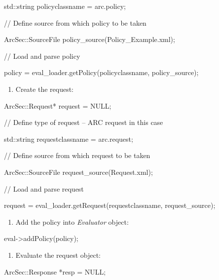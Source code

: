 \documentclass{article}
\newcommand\liststyleWWviiiNumv{%
\renewcommand\theenumi{\alph{enumi}}
\renewcommand\theenumii{\arabic{enumii}}
\renewcommand\theenumiii{\arabic{enumiii}}
\renewcommand\theenumiv{\arabic{enumiv}}
\renewcommand\labelenumi{\theenumi)}
\renewcommand\labelenumii{\theenumii.}
\renewcommand\labelenumiii{\theenumiii.}
\renewcommand\labelenumiv{\theenumiv.}
}
\newcommand\liststyleWWviiiNumvi{%
\renewcommand\theenumi{\alph{enumi}}
\renewcommand\theenumii{\arabic{enumii}}
\renewcommand\theenumiii{\arabic{enumiii}}
\renewcommand\theenumiv{\arabic{enumiv}}
\renewcommand\labelenumi{\theenumi)}
\renewcommand\labelenumii{\theenumii.}
\renewcommand\labelenumiii{\theenumiii.}
\renewcommand\labelenumiv{\theenumiv.}
}
\newcommand\liststyleWWviiiNumvii{%
\renewcommand\theenumi{\alph{enumi}}
\renewcommand\theenumii{\arabic{enumii}}
\renewcommand\theenumiii{\arabic{enumiii}}
\renewcommand\theenumiv{\arabic{enumiv}}
\renewcommand\labelenumi{\theenumi)}
\renewcommand\labelenumii{\theenumii.}
\renewcommand\labelenumiii{\theenumiii.}
\renewcommand\labelenumiv{\theenumiv.}
}
\begin{document}
{\ttfamily\color{black}
std::string policyclassname = {\textquotedbl}arc.policy{\textquotedbl};
}

{\ttfamily\color{black}
// Define source from which policy to be taken}

{\ttfamily\color{black}
ArcSec::SourceFile
policy\_source({\textquotedbl}Policy\_Example.xml{\textquotedbl}); }

{\ttfamily\color{black}
// Load and parse policy}

{\ttfamily\color{black}
policy = eval\_loader.getPolicy(policyclassname, policy\_source); }

\liststyleWWviiiNumv
\begin{enumerate}
\item {\color{black}
Create the request:}
\end{enumerate}
{\ttfamily\color{black}
ArcSec::Request* request = NULL;}

{\ttfamily\color{black}
// Define type of request -- ARC request in this case}

{\ttfamily\color{black}
std::string requestclassname =
{\textquotedbl}arc.request{\textquotedbl};}

{\ttfamily\color{black}
// Define source from which request to be taken}

{\ttfamily\color{black}
ArcSec::SourceFile
request\_source({\textquotedbl}Request.xml{\textquotedbl});}

{\ttfamily\color{black}
// Load and parse request}

{\ttfamily\color{black}
request = eval\_loader.getRequest(requestclassname, request\_source);}

\liststyleWWviiiNumvi
\begin{enumerate}
\item {\color{black}
Add the policy into \textit{Evaluator} object:}
\end{enumerate}
{\ttfamily\color{black}
eval-{\textgreater}addPolicy(policy);}

\liststyleWWviiiNumvii
\begin{enumerate}
\item {\color{black}
Evaluate the request object:}
\end{enumerate}
{\ttfamily\color{black}
ArcSec::Response *resp = NULL;}
\end{document}
